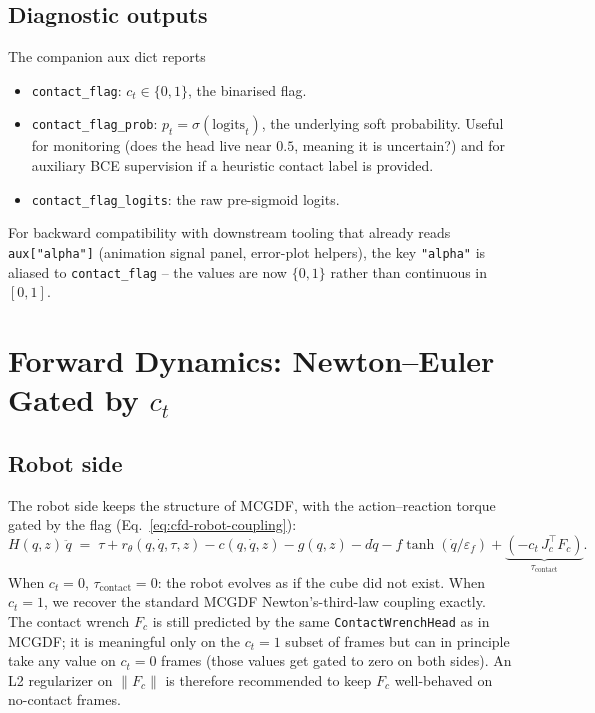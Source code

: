 \documentclass[11pt]{article}
\begin{document}
\subsection{Diagnostic outputs}

The companion aux dict reports
\begin{itemize}
  \item \texttt{contact\_flag}: $c_t \in \{0, 1\}$, the binarised flag.
  \item \texttt{contact\_flag\_prob}: $p_t = \sigma(\mathrm{logits}_t)$,
    the underlying soft probability.  Useful for monitoring (does the
    head live near $0.5$, meaning it is uncertain?) and for auxiliary
    BCE supervision if a heuristic contact label is provided.
  \item \texttt{contact\_flag\_logits}: the raw pre-sigmoid logits.
\end{itemize}
For backward compatibility with downstream tooling that already reads
\texttt{aux["alpha"]} (animation signal panel, error-plot helpers),
the key \texttt{"alpha"} is aliased to \texttt{contact\_flag} -- the
values are now $\{0, 1\}$ rather than continuous in $[0, 1]$.

\section{Forward Dynamics: Newton--Euler Gated by $c_t$}

\subsection{Robot side}

The robot side keeps the structure of MCGDF, with the
action--reaction torque gated by the flag
(Eq.~\eqref{eq:cfd-robot-coupling}):
\begin{equation}
  H(q,z)\,\ddot q
  \;=\;
  \tau + r_\theta(q,\dot q, \tau, z)
  - c(q,\dot q,z) - g(q,z)
  - d\dot q - f\tanh(\dot q/\varepsilon_f)
  + \underbrace{(-c_t\,J_c^\top F_c)}_{\tau_{\mathrm{contact}}}.
  \label{eq:cfd-robot}
\end{equation}
When $c_t = 0$, $\tau_{\mathrm{contact}} = 0$: the robot evolves as
if the cube did not exist.  When $c_t = 1$, we recover the standard
MCGDF Newton's-third-law coupling exactly.  The contact wrench $F_c$
is still predicted by the same \texttt{ContactWrenchHead} as in
MCGDF; it is meaningful only on the $c_t = 1$ subset of frames but
can in principle take any value on $c_t = 0$ frames (those values get
gated to zero on both sides).  An L2 regularizer on $\|F_c\|$ is
therefore recommended to keep $F_c$ well-behaved on no-contact
frames.
\end{document}
